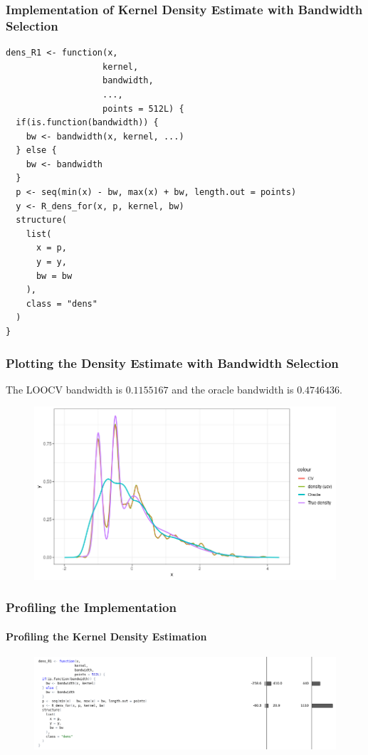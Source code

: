 \documentclass[aspectratio=169]{beamer}
\begin{document}
\begin{frame}[fragile]
  \frametitle{Implementation of Kernel Density Estimate with Bandwidth Selection}
\begin{verbatim}
dens_R1 <- function(x,
                   kernel,
                   bandwidth,
                   ...,
                   points = 512L) {
  if(is.function(bandwidth)) {
    bw <- bandwidth(x, kernel, ...)
  } else {
    bw <- bandwidth
  }
  p <- seq(min(x) - bw, max(x) + bw, length.out = points)
  y <- R_dens_for(x, p, kernel, bw)
  structure(
    list(
      x = p,
      y = y,
      bw = bw
    ),
    class = "dens"
  )
}
\end{verbatim}
\end{frame}
\begin{frame}
  \frametitle{Plotting the Density Estimate with Bandwidth Selection}
  The LOOCV bandwidth is $0.1155167$ and the oracle bandwidth is $0.4746436$.
  \begin{figure}
    \centering
    \includegraphics[scale = 0.5]{figure/application.png}
  \end{figure}
\end{frame}
\begin{frame}[fragile]
  \frametitle{Profiling the Implementation}
  \framesubtitle{Profiling the Kernel Density Estimation}
  \begin{figure}
    \centering
    \includegraphics[scale = 0.35]{figure/density_profile.png}
  \end{figure}
\end{frame}
\end{document}
